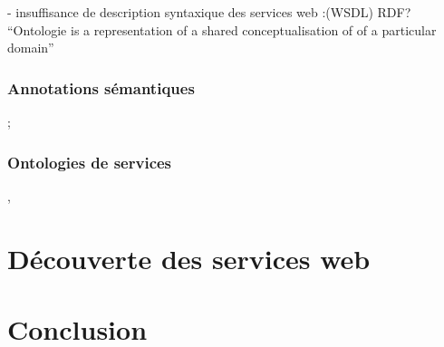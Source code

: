 	    - insuffisance de description syntaxique des services web :(WSDL)
	     RDF? \cite{lassila1999resource}\\
	    ``Ontologie is a representation of a shared conceptualisation of of a particular domain'' 

	\subsubsection{Annotations sémantiques};
	\subsubsection{Ontologies de services} 
	  \cite{mcguinness2004owl} , \cite{mcilraith2003bringing}

\section{Découverte des services web}


\section{Conclusion}
